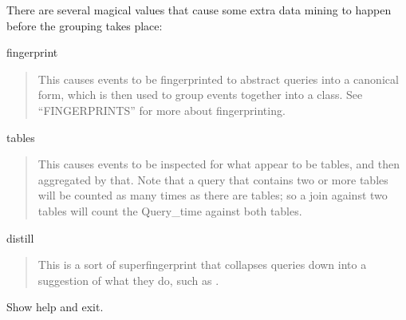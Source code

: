 \documentclass[letterpaper,10pt,english]{sphinxmanual}
\begin{document}
\begin{fulllineitems}
There are several magical values that cause some extra data mining to happen
before the grouping takes place:

fingerprint
\begin{quote}

This causes events to be fingerprinted to abstract queries into
a canonical form, which is then used to group events together into a class.
See “FINGERPRINTS” for more about fingerprinting.
\end{quote}

tables
\begin{quote}

This causes events to be inspected for what appear to be tables, and
then aggregated by that.  Note that a query that contains two or more tables
will be counted as many times as there are tables; so a join against two tables
will count the Query\_time against both tables.
\end{quote}

distill
\begin{quote}

This is a sort of super\sphinxhyphen{}fingerprint that collapses queries down
into a suggestion of what they do, such as .
\end{quote}

\end{fulllineitems}


\begin{fulllineitems}
\label{\detokenize{mariadb-query-digest:cmdoption-mariadb-query-digest-help}}
Show help and exit.

\end{fulllineitems}

\end{document}
